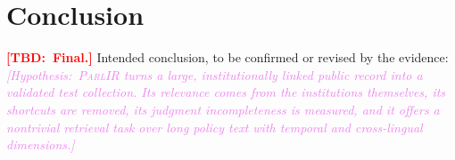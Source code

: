 \documentclass[runningheads]{llncs}
\newcommand{\TBD}[1]{\textcolor{red}{\textbf{[TBD:~#1]}}}
\newcommand{\HYP}[1]{\textcolor{violet}{\textit{[Hypothesis:~#1]}}}
\newcommand{\TBD}[1]{\errmessage{Unresolved TBD: #1}}
\newcommand{\HYP}[1]{#1}
\newcommand{\parlir}{\textsc{ParlIR}}
\begin{document}
\section{Conclusion}
\TBD{Final.} Intended conclusion, to be confirmed or revised by the evidence:
\HYP{\parlir{} turns a large, institutionally linked public record into a
validated test collection. Its relevance comes from the institutions
themselves, its shortcuts are removed, its judgment incompleteness is
measured, and it offers a nontrivial retrieval task over long policy text
with temporal and cross-lingual dimensions.}

\end{document}
